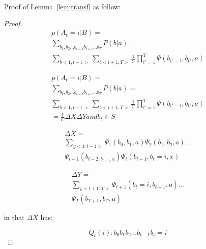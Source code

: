 \documentclass[journal,transmag]{IEEEtran}
\begin{document}
Proof of Lemma~\ref{lem:transf} as follow:
\begin{proof}

\begin{equation}\label{eq:crfinpl3}
\begin{array}{ll}
      p(A_t=i|B)= \\
      \sum_{b_1,b_2 \dots b_{t-1}b_{t+1}\dots b_T} P(b|a) = \\
      \sum_{b<1,t-1>} \sum_{b<t+1,T>} \frac{1}{C} \prod^T_{t'=1}  \Psi  (b_{t'-1},b_{t'},a)       
\end{array}
\end{equation}

\begin{equation}\label{eq:crfinpl4}
\begin{array}{ll}
      p(A_t=i|B)= \\
      \sum_{b_1,b_2 \dots b_{t-1}b_{t+1}\dots b_T} P(b|a) = \\
      \sum_{b<1,t-1>} \sum_{b<t+1,T>} \frac{1}{C} \prod^T_{t'=1}  \Psi  (b_{t'-1},b_{t'},a)    \\
      = \frac{1}{C} \Delta X \Delta Y   and   b_t \in S
\end{array}
\end{equation}

\begin{equation}\label{eq:crfinpl5}
\begin{array}{ll}
      \Delta X = \\
      \sum_{y<1:t-1>} \Psi_1 (b_0,b_1,a) \Psi_2(b_1,b_2,a) \dots \\
       \Psi_{i-1} (b_{t-2,b_{t-1},a}) \Psi_t (b_{t-1},b_t=i,x) 
     \end{array}
\end{equation}

\begin{equation}\label{eq:crfinpl6}
\begin{array}{ll}
      \Delta Y = \\
      \sum_{y<t+1:T>} \Psi_{t+1} (b_t=i,b_{t+1},a)  \dots \\
      \Psi_T(b_{T+1},b_T,a) 
     \end{array}
\end{equation}

in that $\Delta X $ has:

\begin{equation}\label{eq:crfinpl7}
        Q_t(i) : b_0 b_1 b_2 \dots b_{t-1} b_t = i
\end{equation}


\end{proof}
\end{document}
